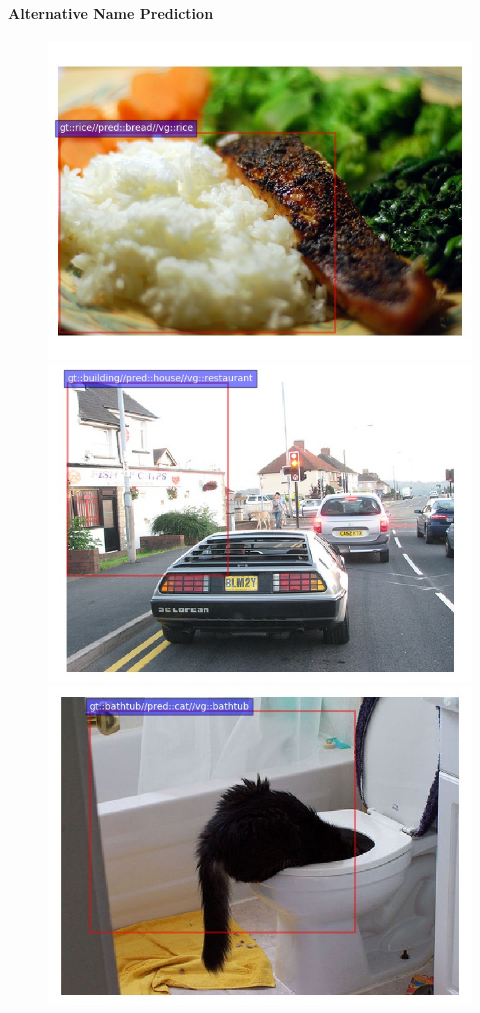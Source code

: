 \paragraph{Alternative Name Prediction}
\begin{figure}
	\centering
	\includegraphics[scale=.2]{images/2323938.jpg}
	\includegraphics[scale=.2]{images/2322259.jpg}
	\includegraphics[scale=.2]{images/2371657.jpg}
	

\end{figure}
